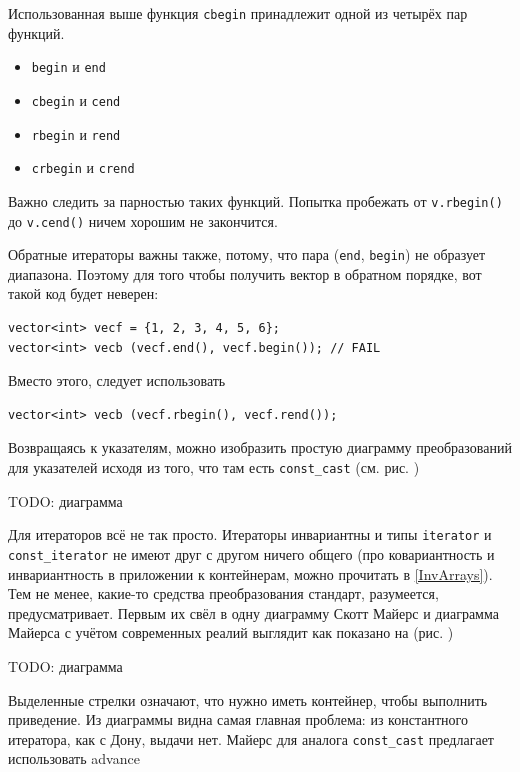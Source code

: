 \documentclass[a4paper,12pt,oneside]{article}
\begin{document}
Использованная выше функция \lstinline!cbegin! принадлежит одной из четырёх пар функций.

\begin{itemize}
\item \lstinline!begin! и \lstinline!end!
\item \lstinline!cbegin! и \lstinline!cend!
\item \lstinline!rbegin! и \lstinline!rend!
\item \lstinline!crbegin! и \lstinline!crend!
\end{itemize}

Важно следить за парностью таких функций. Попытка пробежать от \lstinline!v.rbegin()! до \lstinline!v.cend()! ничем хорошим не закончится.

Обратные итераторы важны также, потому, что пара (\lstinline!end!, \lstinline!begin!) не образует диапазона. Поэтому для того чтобы получить вектор в обратном порядке, вот такой код будет неверен:

\begin{lstlisting}
vector<int> vecf = {1, 2, 3, 4, 5, 6};
vector<int> vecb (vecf.end(), vecf.begin()); // FAIL
\end{lstlisting}

Вместо этого, следует использовать

\begin{lstlisting}
vector<int> vecb (vecf.rbegin(), vecf.rend());
\end{lstlisting}

Возвращаясь к указателям, можно изобразить простую диаграмму преобразований для указателей исходя из того, что там есть \lstinline!const_cast! (см. рис. )

TODO: диаграмма

Для итераторов всё не так просто. Итераторы инвариантны и типы \lstinline!iterator! и \lstinline!const_iterator! не имеют друг с другом ничего общего (про ковариантность и инвариантность в приложении к контейнерам, можно прочитать в \ref{InvArrays}). Тем не менее, какие-то средства преобразования стандарт, разумеется, предусматривает. Первым их свёл в одну диаграмму Скотт Майерс и диаграмма Майерса с учётом современных реалий выглядит как показано на (рис. )

TODO: диаграмма

Выделенные стрелки означают, что нужно иметь контейнер, чтобы выполнить приведение. Из диаграммы видна самая главная проблема: из константного итератора, как с Дону, выдачи нет. Майерс для аналога \lstinline!const_cast! предлагает использовать advance
\end{document}
